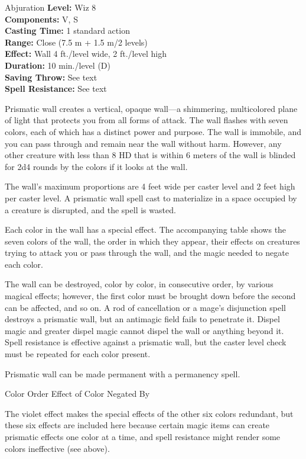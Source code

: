 {Abjuration}
{
	\textbf{Level:}
	Wiz 8\\
	\textbf{Components:}
	V, S\\
	\textbf{Casting Time:}
	1 standard action\\
	\textbf{Range:}
	Close (7.5 m + 1.5 m/2 levels)\\
	\textbf{Effect:}
	Wall 4 ft./level wide, 2 ft./level high\\
	\textbf{Duration:}
	10 min./level (D)\\
	\textbf{Saving Throw:}
	See text\\
	\textbf{Spell Resistance:}
	See text\\
}
{
	Prismatic wall creates a vertical, opaque wall---a shimmering, multicolored plane of light that protects you from all forms of attack. The wall flashes with seven colors, each of which has a distinct power and purpose. The wall is immobile, and you can pass through and remain near the wall without harm. However, any other creature with less than 8 HD that is within 6 meters of the wall is blinded for 2d4 rounds by the colors if it looks at the wall.

	The wall's maximum proportions are 4 feet wide per caster level and 2 feet high per caster level. A prismatic wall spell cast to materialize in a space occupied by a creature is disrupted, and the spell is wasted.

	Each color in the wall has a special effect. The accompanying table shows the seven colors of the wall, the order in which they appear, their effects on creatures trying to attack you or pass through the wall, and the magic needed to negate each color.

	The wall can be destroyed, color by color, in consecutive order, by various magical effects; however, the first color must be brought down before the second can be affected, and so on. A rod of cancellation or a mage's disjunction spell destroys a prismatic wall, but an antimagic field fails to penetrate it. Dispel magic and greater dispel magic cannot dispel the wall or anything beyond it. Spell resistance is effective against a prismatic wall, but the caster level check must be repeated for each color present.

	Prismatic wall can be made permanent with a permanency spell.

{

Color
Order
Effect of Color
Negated By




The violet effect makes the special effects of the other six colors redundant, but these six effects are included here because certain magic items can create prismatic effects one color at a time, and spell resistance might render some colors ineffective (see above).

}}
